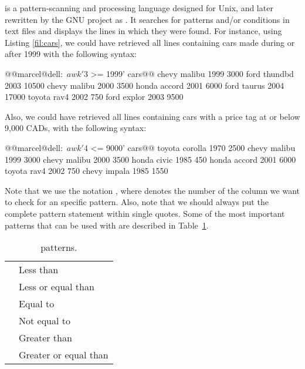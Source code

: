 is a pattern-scanning and processing language designed for Unix, and later rewritten by the \acs{GNU} project as . It searches for patterns and/or conditions in text files and displays the lines in which they were found. For instance, using Listing \ref{fil:cars}, we could have retrieved all lines containing cars made during or after 1999 with the following syntax:
\begin{command_line}[make]
@@marcel@dell:~$ awk '$3 >= 1999' cars@@
chevy malibu 1999 3000
ford thundbd 2003 10500
chevy malibu 2000 3500
honda accord 2001 6000
ford taurus 2004 17000
toyota rav4 2002 750
ford explor 2003 9500
\end{command_line}

Also, we could have retrieved all lines containing cars with a price tag at or below 9,000 CADs, with the following syntax:

\begin{command_line}[make]
@@marcel@dell:~$ awk '$4 <= 9000' cars@@
toyota corolla 1970 2500
chevy malibu 1999 3000
chevy malibu 2000 3500
honda civic 1985 450
honda accord 2001 6000
toyota rav4 2002 750
chevy impala 1985 1550
\end{command_line}

Note that we use the notation , where  denotes the number of the column we want to check for an specific pattern. Also, note that we should always put the complete pattern statement within single quotes. Some of the most important patterns that can be used with  are described in Table~\ref{tab:awk_patterns}.

\begin{table}[!htbp]
   \myfloatalign
   \begin{tabularx}{\textwidth}{Xp{105mm}} \toprule
     \mycommand{<} & Less than \\
     \mycommand{<=} & Less or equal than\\
     \mycommand{==} & Equal to \\
     \mycommand{!=} & Not equal to\\
	   \mycommand{>} & Greater than\\
     \mycommand{=>} & Greater or equal than\\
   \bottomrule
   \end{tabularx}
\caption{ patterns.}
\label{tab:awk_patterns}
\end{table}


